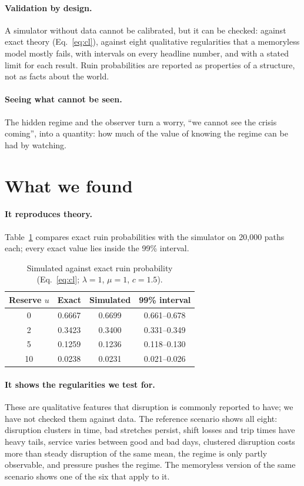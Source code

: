 \documentclass[10pt,twocolumn,a4paper]{article}
\begin{document}
\paragraph{Validation by design.} A simulator without data cannot be calibrated, but it can be checked: against exact theory (Eq.~\ref{eq:cl}), against eight qualitative regularities that a memoryless model mostly fails, with intervals on every headline number, and with a stated limit for each result. Ruin probabilities are reported as properties of a structure, not as facts about the world.

\paragraph{Seeing what cannot be seen.} The hidden regime and the observer turn a worry, ``we cannot see the crisis coming'', into a quantity: how much of the value of knowing the regime can be had by watching.

\section{What we found}\label{sec:found}
\paragraph{It reproduces theory.} Table~\ref{tab:cl} compares exact ruin probabilities with the simulator on 20,000 paths each; every exact value lies inside the 99\% interval.

\begin{table}[t]
\centering\small
\caption{Simulated against exact ruin probability (Eq.~\ref{eq:cl}; $\lambda{=}1$, $\mu{=}1$, $c{=}1.5$).}
\label{tab:cl}
\begin{tabular}{@{}cccc@{}}
\toprule
Reserve $u$ & Exact & Simulated & 99\% interval \\
\midrule
0 & 0.6667 & 0.6699 & 0.661--0.678 \\
2 & 0.3423 & 0.3400 & 0.331--0.349 \\
5 & 0.1259 & 0.1236 & 0.118--0.130 \\
10 & 0.0238 & 0.0231 & 0.021--0.026 \\
\bottomrule
\end{tabular}
\end{table}

\paragraph{It shows the regularities we test for.} These are qualitative features that disruption is commonly reported to have; we have not checked them against data. The reference scenario shows all eight: disruption clusters in time, bad stretches persist, shift losses and trip times have heavy tails, service varies between good and bad days, clustered disruption costs more than steady disruption of the same mean, the regime is only partly observable, and pressure pushes the regime. The memoryless version of the same scenario shows one of the six that apply to it.
\end{document}
